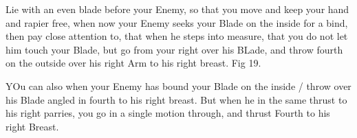 \newpage


\newpage





Lie with an even blade before your Enemy, so that you move and keep
your hand and rapier free, when now your Enemy seeks your Blade on the
inside for a bind, then pay close attention to, that when he steps
into measure, that you do not let him touch your Blade, but go from
your right over his BLade, and throw fourth on the outside over his
right Arm to his right breast. Fig 19.

\exercise{}


YOu can also when your Enemy has bound your Blade on the inside /
throw over his Blade angled in fourth to his right breast. But when he
in the same thrust to his right parries, you go in a single motion
through, and thrust Fourth to his right Breast.

\exercise{}


